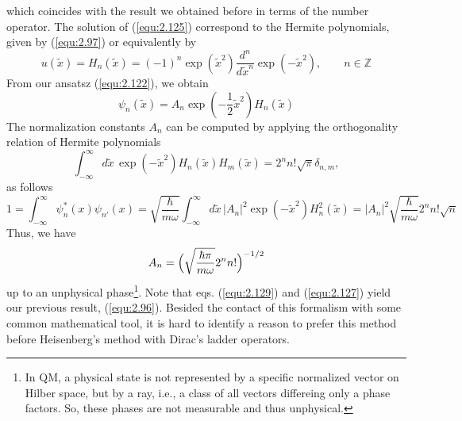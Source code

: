 which coincides with the result we obtained before in terms
of the number operator. The solution of (\ref{equ:2.125})
correspond to the Hermite polynomials, given by
(\ref{equ:2.97}) or equivalently by
\begin{equation}
  u(\tilde{x}) = H_n(\tilde{x}) = (-1)^n \exp(\tilde{x}^2)
  \frac{d^n}{d\tilde{x}^n} \exp(-\tilde{x}^2), \qquad n \in
  \mathbb{Z}
  \label{equ:2.126}
\end{equation}
From our ansatsz (\ref{equ:2.122}), we obtain
\begin{equation}
  \psi_n(\tilde{x}) = A_n
  \exp(-\frac{1}{2}\tilde{x}^2)H_n(\tilde{x})
  \label{equ:2.127}
\end{equation}
The normalization constants $A_n$ can be computed by
applying the orthogonality relation of Hermite polynomials
\begin{equation}
  \int_{-\infty}^{\infty} d\tilde{x} \,
  \exp(-\tilde{x}^2) H_n(\tilde{x}) H_m(\tilde{x}) = 2^n n!
  \sqrt{\pi} \delta_{n,m},
  \label{equ:2.128}
\end{equation}
as follows
$$
1 = \int_{-\infty}^{\infty} \psi_n^*(x) \psi_{n'} (x) =
\sqrt{\frac{\hbar}{m\omega}} \int_{-\infty}^{\infty}
d\tilde{x} \, \vert A_n\vert ^2 \exp(-\tilde{x}^2) H_n^2(\tilde{x}) =
\vert A_n\vert ^2 \sqrt{\frac{\hbar}{m\omega}} 2^n n! \sqrt{n}
$$
Thus, we have
\begin{equation}
  A_n = \Bigl(\sqrt{\frac{\hbar \pi}{m\omega}}2^n n!\Bigr)^{-1/2}
  \label{equ:2.129}
\end{equation}
up to an unphysical phase\footnote{In QM, a physical state
is not represented by a specific normalized vector on Hilber
space, but by a ray, i.e., a class of all vectors differeing
only a phase factors. So, these phases are not measurable
and thus unphysical.}. Note that eqs. (\ref{equ:2.129}) and
(\ref{equ:2.127}) yield our previous result,
(\ref{equ:2.96}).
Besided the contact of this formalism with some common
mathematical tool, it is hard to identify a reason to prefer
this method before Heisenberg's method with Dirac's ladder
operators.
%
